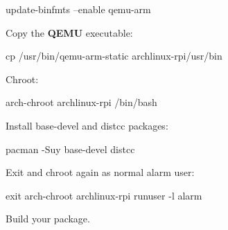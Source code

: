 \documentclass[11pt,a4paper,oneside]{report}
\begin{document}
\begin{appendices}
\begin{bashcode}    
update-binfmts --enable qemu-arm
\end{bashcode}


Copy the \textbf{QEMU} executable:

\begin{bashcode}
cp /usr/bin/qemu-arm-static archlinux-rpi/usr/bin
\end{bashcode}


Chroot:

\begin{bashcode}
arch-chroot archlinux-rpi /bin/bash
\end{bashcode}


Install base-devel and distcc packages:

\begin{bashcode}
pacman -Suy base-devel distcc
\end{bashcode}


Exit and chroot again as normal alarm user:

\begin{bashcode}
exit
arch-chroot archlinux-rpi runuser -l alarm
\end{bashcode}


Build your package.

\end{appendices}
\end{document}

